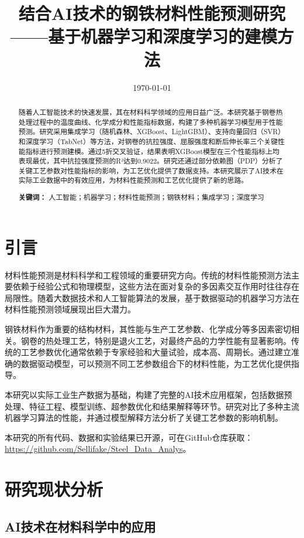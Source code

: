 \documentclass[12pt,a4paper]{article}
\title{\textbf{结合AI技术的钢铁材料性能预测研究\\\Large ——基于机器学习和深度学习的建模方法}}
\author{}
\date{\today}
\begin{document}
\maketitle

\begin{abstract}
随着人工智能技术的快速发展，其在材料科学领域的应用日益广泛。本研究基于钢卷热处理过程中的温度曲线、化学成分和性能指标数据，构建了多种机器学习模型用于性能预测。研究采用集成学习（随机森林、XGBoost、LightGBM）、支持向量回归（SVR）和深度学习（TabNet）等方法，对钢卷的抗拉强度、屈服强度和断后伸长率三个关键性能指标进行预测建模。通过5折交叉验证，结果表明XGBoost模型在三个性能指标上均表现最优，其中抗拉强度预测的R²达到0.9022。研究还通过部分依赖图（PDP）分析了关键工艺参数对性能指标的影响，为工艺优化提供了数据支持。本研究展示了AI技术在实际工业数据中的有效应用，为材料性能预测和工艺优化提供了新的思路。

\textbf{关键词：} 人工智能；机器学习；材料性能预测；钢铁材料；集成学习；深度学习
\end{abstract}

\section{引言}

材料性能预测是材料科学和工程领域的重要研究方向。传统的材料性能预测方法主要依赖于经验公式和物理模型，这些方法在面对复杂的多因素交互作用时往往存在局限性。随着大数据技术和人工智能算法的发展，基于数据驱动的机器学习方法在材料性能预测领域展现出巨大潜力。

钢铁材料作为重要的结构材料，其性能与生产工艺参数、化学成分等多因素密切相关。钢卷的热处理工艺，特别是退火工艺，对最终产品的力学性能有显著影响。传统的工艺参数优化通常依赖于专家经验和大量试验，成本高、周期长。通过建立准确的数据驱动模型，可以预测不同工艺参数组合下的材料性能，为工艺优化提供指导。

本研究以实际工业生产数据为基础，构建了完整的AI技术应用框架，包括数据预处理、特征工程、模型训练、超参数优化和结果解释等环节。研究对比了多种主流机器学习算法的性能，并通过模型解释方法分析了关键工艺参数的影响机制。

本研究的所有代码、数据和实验结果已开源，可在GitHub仓库获取：\url{https://github.com/Sellifake/Steel_Data_Analys}。

\section{研究现状分析}

\subsection{AI技术在材料科学中的应用}
\end{document}
